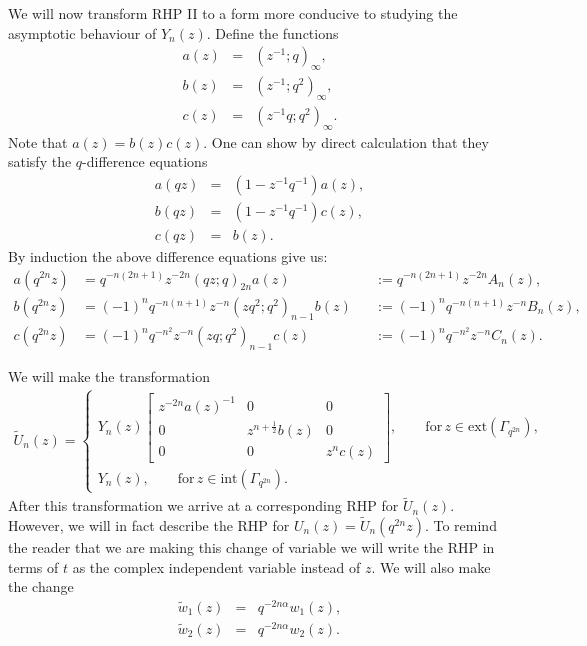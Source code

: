\documentclass[a4paper,reqno]{amsart}
\numberwithin{equation}{section}
\numberwithin{figure}{section}
\begin{document}
We will now transform RHP II to a form more conducive to studying the asymptotic behaviour of $Y_n(z)$. Define the functions
\begin{eqnarray*}
 a(z) &=& (z^{-1};q)_\infty ,\\
 b(z) &=& (z^{-1};q^2)_\infty ,\\
 c(z) &=& (z^{-1}q;q^2)_\infty .
\end{eqnarray*}
Note that $a(z)=b(z)c(z)$. One can show by direct calculation that they satisfy the $q$-difference equations
\begin{eqnarray*}
 a(qz) &=& (1-z^{-1}q^{-1})a(z) ,\\
 b(qz) &=& (1-z^{-1}q^{-1})c(z) ,\\
 c(qz) &=& b(z).
\end{eqnarray*}
By induction the above difference equations give us:
\begin{subequations}
   \begin{alignat}{2}\label{induct diff}
    a(q^{2n}z) &= q^{-n(2n+1)}z^{-2n}(qz;q)_{2n}a(z)&&:= q^{-n(2n+1)}z^{-2n}A_n(z),\\
    b(q^{2n}z) &= (-1)^nq^{-n(n+1)}z^{-n}(zq^2;q^2)_{n-1}b(z) &&:= (-1)^nq^{-n(n+1)}z^{-n} B_n(z),\\
    c(q^{2n}z) &= (-1)^nq^{-n^2}z^{-n}(zq;q^2)_{n-1}c(z)&&:= (-1)^nq^{-n^2}z^{-n}C_n(z).
\end{alignat} 
\end{subequations}

We will make the transformation
\begin{gather} \label{U transform}
\tilde{U}_n(z)=
\begin{cases}
Y_{n}(z)
\begin{bmatrix}
z^{-2n}a(z)^{-1} & 0 &0 \\
0 & z^{n+\frac{1}{2}}b(z) &0\\
0&0&z^nc(z) 
\end{bmatrix},\qquad \text{for}\,z\in \text{ext}(\Gamma_{q^{2n}}),\\
Y_{n}(z), \qquad  \text{for}\,z \in \text{int}(\Gamma_{q^{2n}}).
\end{cases}
\end{gather}
After this transformation we arrive at a corresponding RHP for $\tilde{U}_n(z)$. However, we will in fact describe the RHP for $U_n(z) = \tilde{U}_n(q^{2n}z)$. To remind the reader that we are making this change of variable we will write the RHP in terms of $t$ as the complex independent variable instead of $z$. We will also make the change
\begin{subequations}\label{weight tilde scaling}
    \begin{eqnarray}
        \tilde{w}_1(z) &=& q^{-2n\alpha}w_1(z),\\
        \tilde{w}_2(z) &=& q^{-2n\alpha}w_2(z).
    \end{eqnarray}
\end{subequations}
\end{document}
